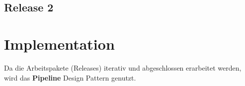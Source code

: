 \documentclass[11pt]{article}
\begin{document}
    \subsection{Release 2}

    \section{Implementation}
    Da die Arbeitspakete (Releases) iterativ und abgeschlossen erarbeitet werden, wird das
    \textbf{Pipeline} Design Pattern\cite{pipeline} genutzt.

    \newpage

    ~\nocite{*}
    \renewcommand{\refname}{Quellen}
    
    
\end{document}
